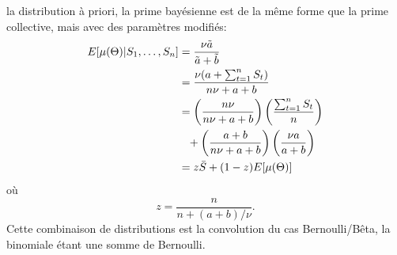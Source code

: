 \begin{exercice}
\begin{sol}
\begin{enumerate}
      la distribution à priori, la prime bayésienne est de la même
      forme que la prime collective, mais avec des paramètres
      modifiés:
      \begin{align*}
        E [ \mu(\Theta)|S_1, \dots, S_n ]
        &= \frac{\nu \tilde{a}}{\tilde{a} + \tilde{b}} \\
        &= \frac{\nu (a + \sum_{t=1}^n S_t)}{n \nu + a + b} \\
        &= \left(\frac{n\nu}{n\nu + a + b}\right)
        \left(\frac{\sum_{t=1}^n S_t}{n}\right) \\
        &\phantom{=}
        + \left(\frac{a + b}{n\nu + a + b}\right)
        \left(\frac{\nu a}{a + b}\right) \\
        &= z \bar{S} + (1 - z) E [ \mu(\Theta) ]
      \end{align*}
      où
      \begin{equation*}
        z = \frac{n}{n + (a + b)/\nu}.
      \end{equation*}
      Cette combinaison de distributions est la convolution du cas
      Bernoulli/Bêta, la binomiale étant une somme de Bernoulli.
    \end{enumerate}
  \end{sol}
\end{exercice}

